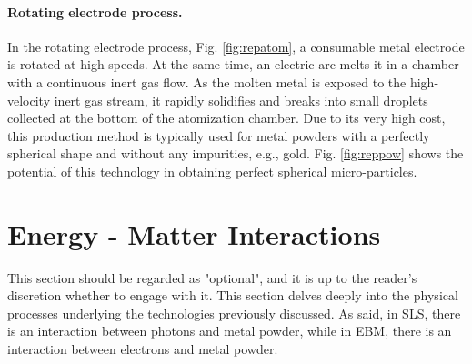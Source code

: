 \paragraph{Rotating electrode process.} In the rotating electrode process, Fig. \ref{fig:repatom}, a consumable metal electrode is rotated at high speeds. At the same time, an electric arc melts it in a chamber with a continuous inert gas flow. As the molten metal is exposed to the high-velocity inert gas stream, it rapidly solidifies and breaks into small droplets collected at the bottom of the atomization chamber. Due to its very high cost, this production method is typically used for metal powders with a perfectly spherical shape and without any impurities, e.g., gold. Fig. \ref{fig:reppow} shows the potential of this technology in obtaining perfect spherical micro-particles.


\section{Energy - Matter Interactions}
\label{sec:matterint}
This section should be regarded as "optional", and it is up to the reader's discretion whether to engage with it. This section delves deeply into the physical processes underlying the technologies previously discussed. As said, in SLS, there is an interaction between photons and metal powder, while in EBM, there is an interaction between electrons and metal powder.
